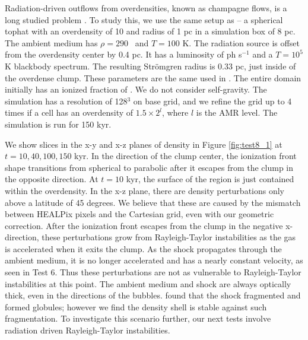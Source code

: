 \documentclass[useAMS,usenatbib,a4paper]{mn2e}
\begin{document}
\begin{figure*}
  \caption{\label{fig:test8_1} Test 8. (Champagne flow from a dense
    clump).  Slices of density through the initial clump center in the
    x-y plane (top) and x-z plane (bottom) at $t = 10, 40, 100, 150$
    kyr.  Notice the instabilities that grow from perturbations
    created while the \hii region is contained in the dense
    clump.}
\end{figure*}

Radiation-driven outflows from overdensities, known as champagne
flows, is a long studied problem \citep[e.g.][\S3.3]{Yorke86}.  To
study this, we use the same setup as \citet{Bisbas09} -- a spherical
tophat with an overdensity of 10 and radius of 1 pc in a simulation
box of 8 pc.  The ambient medium has $\rho = 290$ \cubecm~and $T =
100$ K.  The radiation source is offset from the overdensity center by
0.4 pc.  It has a luminosity of  ph s$^{-1}$ and a $T=10^5$
K blackbody spectrum.  The resulting Str\"{o}mgren radius is 0.33 pc,
just inside of the overdense clump.  These parameters are the same
used in \citet{Bisbas09}.  The entire domain initially has an ionized
fraction of .  We do not consider self-gravity.  The
simulation has a resolution of 128$^3$ on base grid, and we refine the
grid up to 4 times if a cell has an overdensity of $1.5 \times 2^l$,
where $l$ is the AMR level.  The simulation is run for 150 kyr.

We show slices in the x-y and x-z planes of density in Figure
\ref{fig:test8_1} at $t = 10, 40, 100, 150$ kyr.  In the direction of
the clump center, the ionization front shape transitions from
spherical to parabolic after it escapes from the clump in the opposite
direction.  At $t = 10$ kyr, the surface of the \hii region is
just contained within the overdensity.  In the x-z plane, there are
density perturbations only above a latitude of 45 degrees.  We believe
that these are caused by the mismatch between HEALPix pixels and the
Cartesian grid, even with our geometric correction.  After the
ionization front escapes from the clump in the negative x-direction,
these perturbations grow from Rayleigh-Taylor instabilities as the gas
is accelerated when it exits the clump.  As the shock propagates
through the ambient medium, it is no longer accelerated and has a
nearly constant velocity, as seen in Test 6.  Thus these perturbations
are not as vulnerable to Rayleigh-Taylor instabilities at this point.
The ambient medium and shock are always optically thick, even in the
directions of the bubbles.  \citeauthor{Bisbas09} found that the shock
fragmented and formed globules; however we find the density shell is
stable against such fragmentation.  To investigate this scenario
further, our next tests involve radiation driven Rayleigh-Taylor
instabilities.
\end{document}
